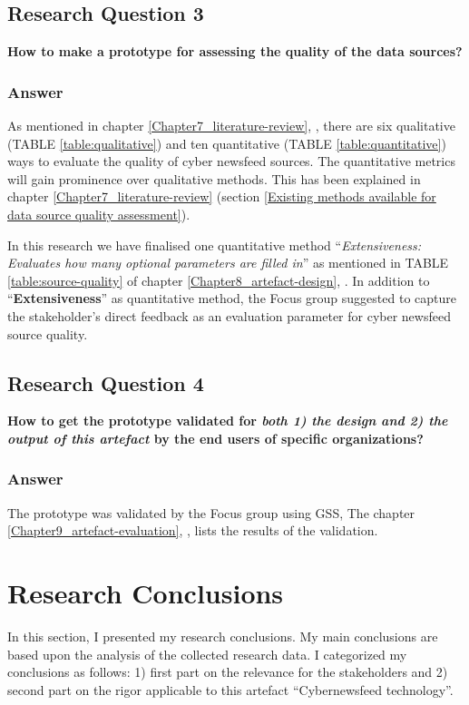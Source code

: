  \subsection{Research Question 3}
 
 \textbf{How to make a prototype for assessing the quality of the data sources?}
 \subsubsection{Answer}
 As mentioned in chapter 
 \ref{Chapter7_literature-review}, , 
 there are six qualitative 
 (TABLE \ref{table:qualitative}) 
 and ten quantitative 
 (TABLE \ref{table:quantitative}) 
 ways to evaluate the quality of cyber newsfeed sources. 
 The quantitative metrics will gain prominence over qualitative methods.
This has been explained in chapter \ref{Chapter7_literature-review} (section \ref{Existing methods available for data source quality assessment}).
 
In this research we have finalised one quantitative method \enquote{\textit{Extensiveness: Evaluates   how   many optional parameters are filled in}} as mentioned in   
TABLE \ref{table:source-quality} 
of 
chapter
\ref{Chapter8_artefact-design}, 
.
In addition to 
\enquote{\textbf{Extensiveness}} 
as quantitative method, 
the Focus group suggested to capture the stakeholder's direct feedback as an evaluation parameter for cyber newsfeed source quality.

 \subsection{Research Question 4}
 \textbf{How to get the prototype validated for \emph{both 1) the design and 2) the output of this artefact} by the end users of specific organizations?}
 \subsubsection{Answer}
The prototype was validated by the Focus group using GSS, The chapter \ref{Chapter9_artefact-evaluation}, ,
lists the results of the  validation. 

\section{Research Conclusions} \label{Research Conclusions}
In this section, I presented my research conclusions.
My main conclusions are based 
upon the analysis of 
the collected research data. 
I categorized my conclusions as follows: 
1) first part on the relevance for the stakeholders and 
2) second part on the rigor applicable to this artefact 
\enquote{Cybernewsfeed technology}. 


